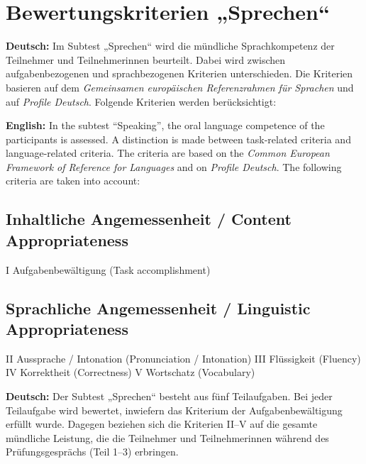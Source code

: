 \documentclass[a4paper]{article}
\title{}
\date{}
\begin{document}
    \maketitle
    
    
    \section{Bewertungskriterien „Sprechen“}
        
        \textbf{Deutsch:}
        Im Subtest „Sprechen“ wird die mündliche Sprachkompetenz der Teilnehmer und Teilnehmerinnen beurteilt. Dabei wird zwischen aufgabenbezogenen und sprachbezogenen Kriterien unterschieden. Die Kriterien basieren auf dem \textit{Gemeinsamen europäischen Referenzrahmen für Sprachen} und auf \textit{Profile Deutsch}. Folgende Kriterien werden berücksichtigt:
        
        \textbf{English:}
        In the subtest “Speaking”, the oral language competence of the participants is assessed. A distinction is made between task-related criteria and language-related criteria. The criteria are based on the \textit{Common European Framework of Reference for Languages} and on \textit{Profile Deutsch}. The following criteria are taken into account:
        
        \subsection{Inhaltliche Angemessenheit / Content Appropriateness}
            
            I Aufgabenbewältigung (Task accomplishment)
        
        \subsection{Sprachliche Angemessenheit / Linguistic Appropriateness}
            
            II Aussprache / Intonation (Pronunciation / Intonation)
            III Flüssigkeit (Fluency)
            IV Korrektheit (Correctness)
            V Wortschatz (Vocabulary)
            
            \textbf{Deutsch:}
            Der Subtest „Sprechen“ besteht aus fünf Teilaufgaben. Bei jeder Teilaufgabe wird bewertet, inwiefern das Kriterium der Aufgabenbewältigung erfüllt wurde. Dagegen beziehen sich die Kriterien II–V auf die gesamte mündliche Leistung, die die Teilnehmer und Teilnehmerinnen während des Prüfungsgesprächs (Teil 1–3) erbringen.
            
\end{document}
